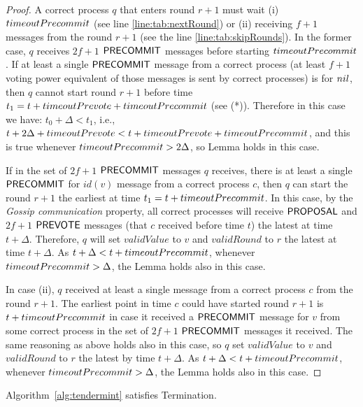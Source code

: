 \begin{proof}
A correct process $q$ that enters round $r+1$ must wait (i) $timeoutPrecommit$ (see line \ref{line:tab:nextRound}) or (ii) receiving $f+1$ messages from the round $r+1$ (see the line \ref{line:tab:skipRounds}). 
In the former case, $q$ receives $2f+1$ $\mathsf{PRECOMMIT}$ messages before starting $timeoutPrecommit$. If at least a single $\mathsf{PRECOMMIT}$ message from a correct process (at least $f+1$ voting power equivalent of those messages is sent by correct processes) is for $nil$, then $q$ cannot start round $r+1$ before time $t_1 = t + timeoutPrevote + timeoutPrecommit$ (see (*)). Therefore in this case we have: $t_0 + \Delta < t_1$, i.e., 
$t+2\Delta+timeoutPrevote <  t + timeoutPrevote + timeoutPrecommit$, and this is true whenever $timeoutPrecommit > 2\Delta$, so Lemma holds in this case. 

If in the set of $2f+1$ $\mathsf{PRECOMMIT}$ messages $q$ receives, there is at least a single $\mathsf{PRECOMMIT}$ for $id(v)$ message from a correct process $c$, 
then $q$ can start the round $r+1$ the earliest at time $t_1 = t+timeoutPrecommit$. In this case,
by the \emph{Gossip communication} property, all correct processes will receive $\mathsf{PROPOSAL}$ and $2f+1$ $\mathsf{PREVOTE}$ messages (that $c$ received before time $t$) the latest at time $t+\Delta$. Therefore, $q$ will set $validValue$ to $v$ and $validRound$ to $r$ the latest at time $t+\Delta$. As $t+\Delta < t+timeoutPrecommit$, whenever $timeoutPrecommit > \Delta$, the Lemma holds also in this case.    

In case (ii), $q$ received at least a single message from a correct process $c$ from the round
$r+1$. The earliest point in time $c$ could have started round $r+1$ is $t+timeoutPrecommit$ in case it received a $\mathsf{PRECOMMIT}$ message for $v$ from some correct process in the set of $2f+1$ $\mathsf{PRECOMMIT}$ messages it received. The same reasoning as above holds also in this case, so $q$ set $validValue$ to $v$ and $validRound$ to $r$ the latest by time $t+\Delta$. As $t+\Delta < t+timeoutPrecommit$, whenever $timeoutPrecommit > \Delta$, the Lemma holds also in this case.    
\end{proof}

\begin{lemma}
	\label{lemma:agreement}
Algorithm~\ref{alg:tendermint} satisfies Termination. 
\end{lemma}

